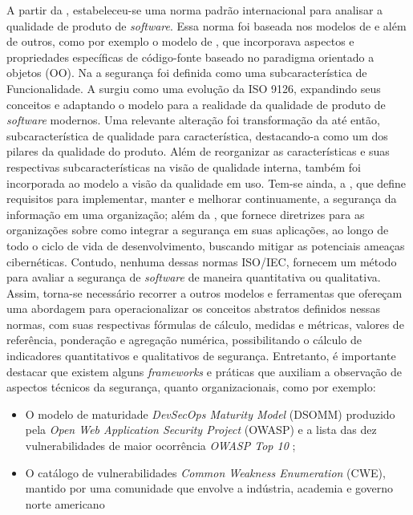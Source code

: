 A partir da , estabeleceu-se uma norma padrão internacional para analisar a qualidade de produto de \textit{software}. Essa norma foi baseada nos modelos de  e  além de outros, como por exemplo o modelo de , que incorporava aspectos e propriedades específicas de código-fonte baseado no paradigma orientado a objetos (OO). Na  a segurança foi definida como uma subcaracterística de Funcionalidade. A  surgiu como uma evolução da ISO 9126, expandindo seus conceitos e adaptando o modelo para a realidade da qualidade de produto de \textit{software} modernos. Uma relevante alteração foi transformação da até então, subcaracterística de qualidade para característica, destacando-a como um dos pilares da qualidade do produto. Além de reorganizar as características e suas respectivas subcaracterísticas na visão de qualidade interna, também foi incorporada ao modelo a visão da qualidade em uso.
Tem-se ainda, a , que define requisitos para implementar, manter e melhorar continuamente, a segurança da informação em uma organização; além da , que fornece diretrizes para as organizações sobre como integrar a segurança em suas aplicações, ao longo de todo o ciclo de vida de desenvolvimento, buscando mitigar as potenciais ameaças cibernéticas. Contudo, nenhuma dessas normas ISO/IEC, fornecem um método para avaliar a segurança de \textit{software} de maneira quantitativa ou qualitativa. Assim, torna-se necessário recorrer a outros modelos e ferramentas que ofereçam uma abordagem para operacionalizar os conceitos abstratos definidos nessas normas, com suas respectivas fórmulas de cálculo, medidas e métricas, valores de referência, ponderação e agregação numérica, possibilitando o cálculo de indicadores quantitativos e qualitativos de segurança. Entretanto, é importante destacar que existem alguns \textit{frameworks} e práticas que auxiliam a observação de aspectos técnicos da segurança, quanto organizacionais, como por exemplo:
\begin{itemize}
    \item O modelo de maturidade \textit{DevSecOps Maturity Model} (DSOMM) produzido pela \textit{Open Web Application Security Project} (OWASP) \cite{owaspsamm} e a lista das dez vulnerabilidades de maior ocorrência \textit{OWASP Top 10} \cite{owasptop10_2021};
    \item O catálogo de vulnerabilidades \textit{Common Weakness Enumeration} (CWE), mantido por uma comunidade que envolve a indústria, academia e governo norte americano \cite{cwe}
\end{itemize}

